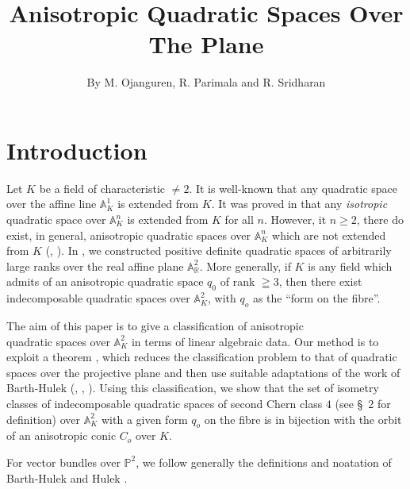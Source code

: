 \title{Anisotropic Quadratic Spaces Over The Plane}

\author{By M. Ojanguren, R. Parimala and R. Sridharan}

\date{}
\maketitle

\setcounter{page}{353}

\setcounter{pageoriginal}{464}
\section*{Introduction}\pageoriginale

Let $K$ be a field of characteristic $\neq 2$. It is well-known that any quadratic space over the affine line $\mathbb{A}^{1}_K$ is extended from $K$. It was proved in \cite{key7} that any \textit{isotropic} quadratic space over $\mathbb{A}^{n}_K$ is extended from $K$ for all $n$. However, it $n\geq 2$, there do exist, in general, anisotropic quadratic spaces over $\mathbb{A}^{n}_K$ which are not extended from $K$ (\cite{key5}, \cite{key9}). In \cite{key8}, we constructed positive definite quadratic spaces of arbitrarily large ranks over the real affine plane $\mathbb{A}^{2}_{\mathbb{R}}$. More generally, if $K$ is any field which admits of an anisotropic quadratic space $q_0$ of rank $\geqq 3$, then there exist \cite{key10} indecomposable quadratic spaces over $\mathbb{A}^{2}_K$, with $q_o$ as the ``form on the fibre''.

The aim of this paper is to give a classification of anisotropic\\ quadratic spaces over $\mathbb{A}^{2}_K$ in terms of linear algebraic data. Our method is to exploit a theorem \cite[theorem 2.1]{key6}, which reduces the classification problem to that of quadratic spaces over the projective plane and then use suitable adaptations of the work of Barth-Hulek (\cite{key1}, \cite{key2}, \cite{key4}). Using this classification, we show that the set of isometry classes of indecomposable quadratic spaces of second Chern class $4$ (see \S\ 2 for definition) over $\mathbb{A}^{2}_K$ with a given form $q_o$ on the fibre is in bijection with the orbit of an anisotropic conic $C_o$ over $K$. 

For vector bundles over $\mathbb{P}^{2}$, we follow generally the definitions and noatation of Barth-Hulek \cite{key2} and Hulek \cite{key4}.

